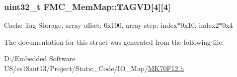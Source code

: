 \subsubsection[{T\+A\+G\+V\+D}]{\setlength{\rightskip}{0pt plus 5cm}uint32\+\_\+t F\+M\+C\+\_\+\+Mem\+Map\+::\+T\+A\+G\+V\+D\mbox{[}4\mbox{]}\mbox{[}4\mbox{]}}\label{struct_f_m_c___mem_map_aceee42cbeff95639e3a10a33f88ecb02}
Cache Tag Storage, array offset\+: 0x100, array step\+: index$\ast$0x10, index2$\ast$0x4 

The documentation for this struct was generated from the following file\+:\begin{DoxyCompactItemize}
\item 
D\+:/\+Embedded Software U\+S/es18aut13/\+Project/\+Static\+\_\+\+Code/\+I\+O\+\_\+\+Map/\hyperlink{_m_k70_f12_8h}{M\+K70\+F12.\+h}\end{DoxyCompactItemize}
